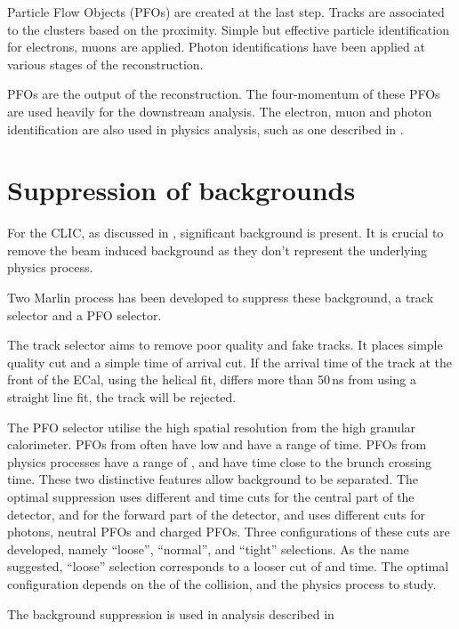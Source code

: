 Particle Flow Objects (PFOs) are created at the last step. Tracks are associated to the clusters based on the proximity. Simple but effective particle identification for electrons, muons are applied. Photon identifications have been applied at various stages of the reconstruction.

PFOs are the output of the \pandora reconstruction. The four-momentum of these PFOs are  used heavily for the downstream analysis. The electron, muon and photon identification are  also used in physics analysis, such as one described in \Chapter{}.

\section{Suppression of \ggHad backgrounds}

For the CLIC, as discussed in \Section{}, significant \ggHad background is present. It is crucial to remove the beam induced background as they don't represent the underlying physics process.

Two Marlin process has been developed to suppress these background, a track selector and a PFO selector\cite{Marshall:2012ry}.

The track selector aims to remove poor quality and fake tracks. It places simple quality cut and a simple time of arrival cut. If the arrival time of the track at the front of the ECal, using the helical fit, differs more than 50\,ns from using a straight line fit, the track will be rejected.

The PFO selector utilise the high spatial resolution from the high granular calorimeter. PFOs from \ggHad often have low \pT and have a range of time. PFOs from physics processes have a range of \pT, and have time close to the brunch crossing time. These two distinctive features allow \ggHad background to be separated. The optimal suppression uses different \pT and time cuts for the central part of the detector, and for the forward part of the detector, and uses different cuts for photons, neutral PFOs and charged PFOs. Three configurations of these cuts are developed, namely ``loose'', ``normal'', and ``tight'' selections. As the name suggested, ``loose'' selection corresponds to a looser cut of \pT and time. The optimal configuration depends on the \sqrtS of the collision, and the physics process to study.

The background suppression is used in analysis described in 
